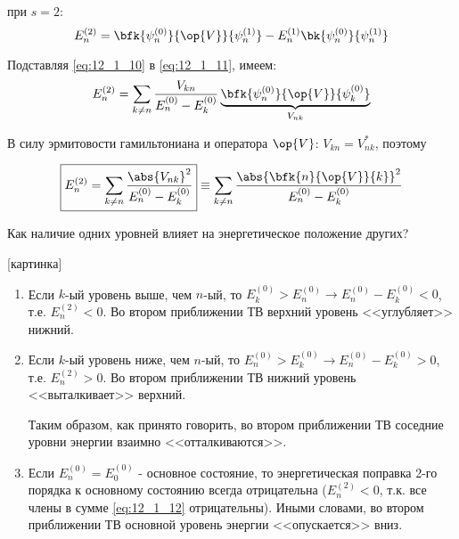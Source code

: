при $s=2$:
\begin{equation}
\label{eq:12_1_11}
E_n^{(2)} = \bfk{\psi_n^{(0)}}{\op{V}}{\psi_n^{(1)}} - E_n^{(1)}\bk{\psi_n^{(0)}}{\psi_n^{(1)}}
\end{equation}

Подставляя \eqref{eq:12_1_10} в \eqref{eq:12_1_11}, имеем:
\begin{gather*}
E_n^{(2)} = \sum_{k \neq n} \frac{V_{kn}}{E_n^{(0)} - E_k^{(0)}} \underbrace{\bfk{\psi_n^{(0)}}{\op{V}}{\psi_k^{(0)}}}_{V_{nk}}
\end{gather*}

В силу эрмитовости гамильтониана и оператора $\op{V}$: $V_{kn} = V_{nk}^{*}$, поэтому

\begin{equation}
\label{eq:12_1_12}
\boxed{E_n^{(2)} = \sum_{k \neq n} \frac{\abs{V_{nk}}^2}{E_n^{(0)} - E_k^{(0)}}} \equiv \sum_{k \neq n} \frac{\abs{\bfk{n}{\op{V}}{k}}^2}{E_n^{(0)} - E_k^{(0)}}
\end{equation}

Как наличие одних уровней влияет на энергетическое положение других?

[картинка]

\begin{enumerate}
\item Если $k$-ый уровень выше, чем $n$-ый, то $E_k^{(0)} > E_n^{(0)} \to E_n^{(0)} - E_k^{(0)} < 0$, т.е. $E_n^{(2)} < 0$. Во втором приближении ТВ верхний уровень <<углубляет>> нижний.

\item Если $k$-ый уровень ниже, чем $n$-ый, то $E_n^{(0)} > E_k^{(0)} \to E_n^{(0)} - E_k^{(0)} > 0$, т.е. $E_n^{(2)} > 0$. Во втором приближении ТВ нижний уровень <<выталкивает>> верхний.

Таким образом, как принято говорить, во втором приближении ТВ соседние уровни энергии взаимно <<отталкиваются>>.

\item Если $E_n^{(0)} = E_0^{(0)}$ - основное состояние, то энергетическая поправка 2-го порядка к основному состоянию всегда отрицательна ($E_n^{(2)} < 0$, т.к. все члены в сумме \eqref{eq:12_1_12} отрицательны). Иными словами, во втором приближении ТВ основной уровень энергии <<опускается>> вниз.

\end{enumerate}

